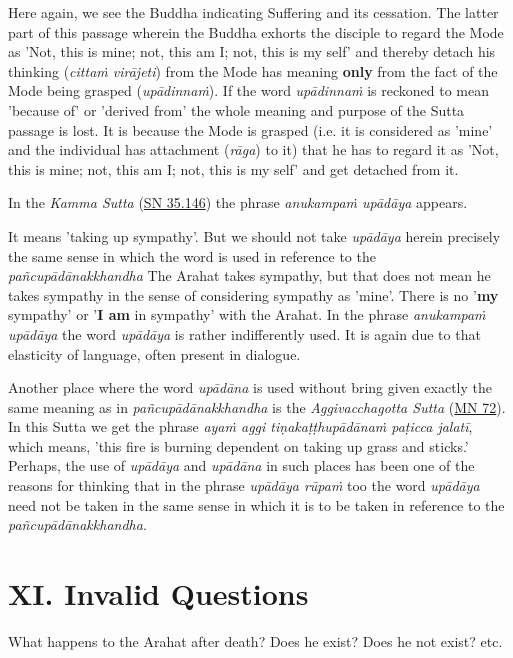 Here again, we see the Buddha indicating Suffering and its cessation.
The latter part of this passage wherein the Buddha exhorts the disciple
to regard the Mode as 'Not, this is mine; not, this am I; not, this is
my self' and thereby detach his thinking (\emph{cittaṁ virājeti}) from the Mode
has meaning \textbf{only} from the fact of the Mode being grasped (\emph{upādinnaṁ}).
If the word \emph{upādinnaṁ} is reckoned to mean 'because of' or 'derived from'
the whole meaning and purpose of the Sutta passage is lost. It is
because the Mode is grasped (i.e. it is considered as 'mine' and the
individual has attachment (\emph{rāga}) to it) that he has to regard it as
'Not, this is mine; not, this am I; not, this is my self' and get
detached from it.


In the \emph{Kamma Sutta} (\href{https://suttacentral.net/sn35.146/en/bodhi}{SN 35.146})
the phrase \emph{anukampaṁ upādāya} appears.


It means 'taking up sympathy'. But we should not take \emph{upādāya} herein precisely the same
sense in which the word is used in reference to the \emph{pañcupādānakkhandha}
The Arahat takes sympathy, but that does not mean he takes sympathy in
the sense of considering sympathy as 'mine'. There is no '\textbf{my} sympathy'
or '\textbf{I am} in sympathy' with the Arahat. In the phrase \emph{anukampaṁ upādāya}
the word \emph{upādāya} is rather indifferently used. It is again due to that
elasticity of language, often present in dialogue.


Another place where
the word \emph{upādāna} is used without bring given exactly the same meaning as
in \emph{pañcupādānakkhandha} is the \emph{Aggivacchagotta Sutta} (\href{https://suttacentral.net/mn72/en/thanissaro}{MN 72}).
In this Sutta we get the phrase \emph{ayaṁ aggi tiṇakaṭṭhupādānaṁ paṭicca jalatī},
which means, 'this fire is burning dependent on taking up
grass and sticks.' Perhaps, the use of \emph{upādāya} and \emph{upādāna} in such
places has been one of the reasons for thinking that in the phrase
\emph{upādāya rūpaṁ} too the word \emph{upādāya} need not be taken in the same sense
in which it is to be taken in reference to the \emph{pañcupādānakkhandha}.


\hypertarget{x-xi.-invalid-questions}{\section*{XI. Invalid Questions}}
What happens to the Arahat after death? Does he exist? Does he not exist? etc.


